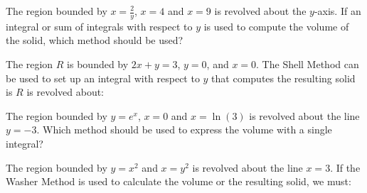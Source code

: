\documentclass{ximera}
\author{Jim Talamo}
\begin{document}
\begin{exercise}
 The region bounded by $x=\frac{2}{y}$, $x=4$ and $x=9$ is revolved about the $y$-axis.  If an integral or sum of integrals with respect to $y$ is used to compute the volume of the solid, which method should be used?
 
\begin{multipleChoice}
\end{multipleChoice}

\end{exercise}


\begin{exercise}
 The region $R$ is bounded by $2x+y=3$, $y=0$, and $x=0$.  The Shell Method can be used to set up an integral with respect to $y$ that computes the resulting solid is $R$ is revolved about:
 
 
\begin{multipleChoice}
\end{multipleChoice}

\end{exercise}

\begin{exercise}
 The region bounded by $y=e^x$, $x=0$ and $x=\ln(3)$ is revolved about the line $y=-3$.  Which method should be used to express the volume with a single integral?

\begin{multipleChoice}
\end{multipleChoice}

\end{exercise}

\begin{exercise}
 The region bounded by $y=x^2$ and $x=y^2$ is revolved about the line $x=3$.  If the Washer Method is used to calculate the volume or the resulting solid, we must:
 
\begin{multipleChoice}
\end{multipleChoice}

\end{exercise}
\end{document}

